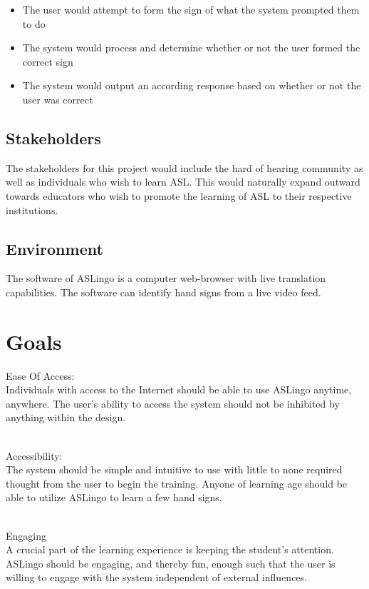 \documentclass{article}
\begin{document}
\begin{itemize}
    \item The user would attempt to form the sign of what the system prompted them to do
    \item The system would process and determine whether or not the user formed the correct sign
    \item The system would output an according response based on whether or not the user was correct
\end{itemize}

\subsection{Stakeholders}

The stakeholders for this project would include the hard of hearing community as well as individuals who wish to learn ASL. This would naturally expand outward towards educators who wish to promote the learning of ASL to their respective institutions.

\subsection{Environment}

The software of ASLingo is a computer web-browser with live translation capabilities. The software can identify hand signs from a live video feed.


\section{Goals}

Ease Of Access:\\
Individuals with access to the Internet should be able to use ASLingo anytime, anywhere. The user's ability to access the system should not be inhibited by anything within the design.

~\\Accessibility:\\
The system should be simple and intuitive to use with little to none required thought from the user to begin the training. Anyone of learning age should be able to utilize ASLingo to learn a few hand signs. 

~\\Engaging\\
A crucial part of the learning experience is keeping the student's attention. ASLingo should be engaging, and thereby fun, enough such that the user is willing to engage with the system independent of external influences.
\end{document}
